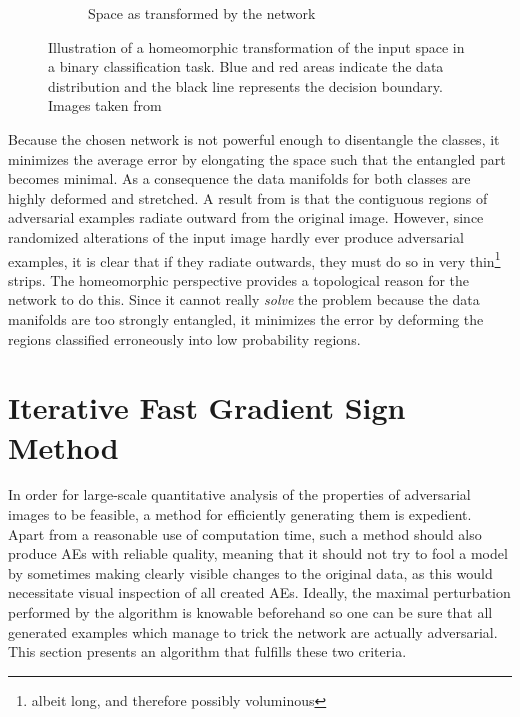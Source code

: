 \documentclass[11pt, a4paper]{article}
\begin{document}
\begin{figure}[h!tb]
\begin{subfigure}[t]{0.45\textwidth}
        \caption{Space as transformed by the network}
        \label{fig:network-homeomorphism-end}
    \end{subfigure}
    \caption[Network function as homeomorphic transformation of input space]{Illustration of a homeomorphic transformation of the input space in a binary classification task. Blue and red areas indicate the data distribution and the black line represents the decision boundary. Images taken from \cite{neural-network-homeomorphic-transformation}}
    \label{fig:network-homeomorphism}
\end{figure}

Because the chosen network is not powerful enough to disentangle the classes, it minimizes the average error by elongating the space such that the entangled part becomes minimal. As a consequence the data manifolds for both classes are highly deformed and stretched. A result from \cite{explaining-and-harnessing-adversarial-examples} is that the contiguous regions of adversarial examples radiate outward from the original image. However, since randomized alterations of the input image hardly ever produce adversarial examples, it is clear that if they radiate outwards, they must do so in very thin\footnote{albeit long, and therefore possibly voluminous} strips. The homeomorphic perspective provides a topological reason for the network to do this. Since it cannot really \emph{solve} the problem because the data manifolds are too strongly entangled, it minimizes the error by deforming the regions classified erroneously into low probability regions.










\section{Iterative Fast Gradient Sign Method}
\label{sec:iterative-fgsm}
In order for large-scale quantitative analysis of the properties of adversarial images to be feasible, a method for efficiently generating them is expedient. Apart from a reasonable use of computation time, such a method should also produce AEs with reliable quality, meaning that it should not try to fool a model by sometimes making clearly visible changes to the original data, as this would necessitate visual inspection of all created AEs. Ideally, the maximal perturbation performed by the algorithm is knowable beforehand so one can be sure that all generated examples which manage to trick the network are actually adversarial. This section presents an algorithm that fulfills these two criteria.
\end{document}
